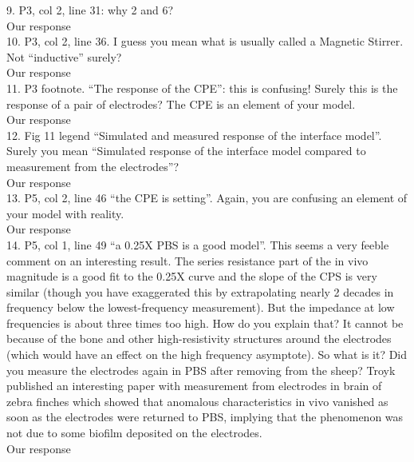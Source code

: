 \documentclass[journal, a4paper]{IEEEtran}
\begin{document}
{9. P3, col 2, line 31: why 2 and 6?\\
{\color{OliveGreen} Our response}\\

10. P3, col 2, line 36. I guess you mean what is usually called a Magnetic Stirrer. Not ``inductive'' surely?\\
{\color{OliveGreen} Our response}\\

11. P3 footnote. ``The response of the CPE'': this is confusing! Surely this is the response of a pair of electrodes? The CPE is an element of your model.\\
{\color{OliveGreen} Our response}\\

12. Fig 11 legend ``Simulated and measured response of the interface model''. Surely you mean ``Simulated response of the interface model compared to measurement from the electrodes''?\\
{\color{OliveGreen} Our response}\\

13. P5, col 2, line 46 ``the CPE is setting''. Again, you are confusing an element of your model with reality.\\
{\color{OliveGreen} Our response}\\

14. P5, col 1, line 49 ``a 0.25X PBS is a good model''.  This seems a very feeble comment on an interesting result. The series resistance part of the in vivo magnitude is a good fit to the 0.25X curve and the slope of the CPS is very similar (though you have exaggerated this by extrapolating nearly 2 decades in frequency below the lowest-frequency measurement). But the impedance at low frequencies is about three times too high. How do you explain that? It cannot be because of the bone and other high-resistivity structures around the electrodes (which would have an effect on the high frequency asymptote). So what is it? Did you measure the electrodes again in PBS after removing from the sheep? Troyk published an interesting paper with measurement from electrodes in brain of zebra finches which showed that anomalous characteristics in vivo vanished as soon as the electrodes were returned to PBS, implying that the phenomenon was not due to some biofilm deposited on the electrodes.\\
{\color{OliveGreen} Our response}\\
}
\end{document}
